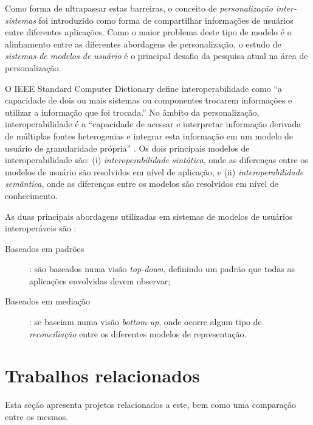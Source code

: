 \documentclass[a4paper]{article}
\begin{document}
Como forma de ultrapassar estas barreiras, o conceito de \emph{personalização inter-sistemas} foi introduzido \cite{niederee04} como forma de compartilhar informações de usuários entre diferentes aplicações. Como o maior problema deste tipo de modelo é o alinhamento entre as diferentes abordagens de personalização, o estudo de \emph{sistemas de modelos de usuário} é o principal desafio da pesquisa atual na área de personalização.\cite{viviani10}

O IEEE Standard Computer Dictionary \cite{ieeedict} define interoperabilidade como ``a capacidade de dois ou mais sistemas ou componentes trocarem informações e utilizar a informação que foi trocada.'' No âmbito da personalização, interoperabilidade é a ``capacidade de acessar e interpretar informação derivada de múltiplas fontes heterogenias e integrar esta informação em um modelo de usuário de granularidade própria'' \cite{carmagnola09}. Os dois principais modelos de interoperabilidade são: (i) \emph{interoperabilidade sintática}, onde as diferenças entre os modelos de usuário são resolvidos em nível de aplicação, e (ii) \emph{interoperabilidade semântica}, onde as diferenças entre os modelos são resolvidos em nível de conhecimento.

As duas principais abordagens utilizadas em sistemas de modelos de usuários interoperáveis são \cite{viviani10}:

\begin{description}

  \item[Baseados em padrões]: são baseados numa visão \emph{top-down}, definindo um padrão que todas as aplicações envolvidas devem observar;
  \item[Baseados em mediação]: se baseiam numa visão \emph{bottom-up}, onde ocorre algum tipo de \emph{reconciliação} entre os diferentes modelos de representação.

\end{description}

%



\section{Trabalhos relacionados}

Esta seção apresenta projetos relacionados a este, bem como uma comparação entre os mesmos.
\end{document}
